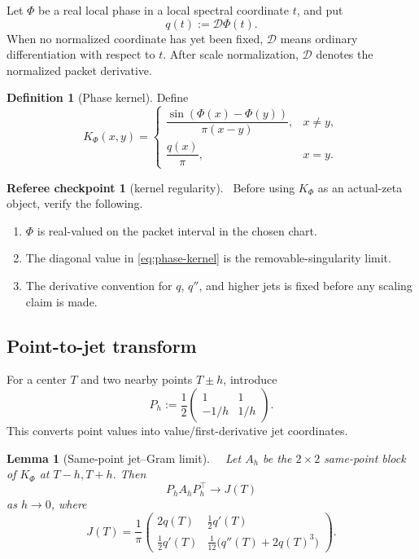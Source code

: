 \documentclass[11pt,a4paper]{amsart}
\newcommand{\Status}[1]{\textnormal{\fbox{\scriptsize\textsf{#1}}}}
\newcommand{\Core}{\Status{CORE}}
\newcommand{\Open}{\Status{OPEN}}
\newcommand{\Ph}{\Phi}
\newcommand{\D}{\mathcal D}
\theoremstyle{plain}
\newtheorem{lemma}[theorem]{Lemma}
\theoremstyle{definition}
\newtheorem{definition}[theorem]{Definition}
\newtheorem{checkpoint}[theorem]{Referee checkpoint}
\begin{document}
Let \(\Ph\) be a real local phase in a local spectral coordinate \(t\), and put
\[
        q(t):=\D\Ph(t).
\]
When no normalized coordinate has yet been fixed, \(\D\) means ordinary differentiation with respect to \(t\).  After scale normalization, \(\D\) denotes the normalized packet derivative.

\begin{definition}[Phase kernel]
\label{def:phase-kernel}
Define
\begin{equation}
\label{eq:phase-kernel}
K_\Ph(x,y)=
\begin{cases}
\dfrac{\sin(\Ph(x)-\Ph(y))}{\pi(x-y)}, & x\ne y,\\[1ex]
\dfrac{q(x)}{\pi}, & x=y.
\end{cases}
\end{equation}
\end{definition}

\begin{checkpoint}[kernel regularity]
\label{chk:kernel-regularity}
\Core\
Before using \(K_\Ph\) as an actual-zeta object, verify the following.
\begin{enumerate}[label=\textup{K\arabic*.},leftmargin=*]
\item \(\Ph\) is real-valued on the packet interval in the chosen chart.
\item The diagonal value in \eqref{eq:phase-kernel} is the removable-singularity limit.
\item The derivative convention for \(q\), \(q''\), and higher jets is fixed before any scaling claim is made.
\end{enumerate}
\end{checkpoint}

\subsection{Point-to-jet transform}
\label{subsec:point-to-jet-transform}

For a center \(T\) and two nearby points \(T\pm h\), introduce
\begin{equation}
\label{eq:point-to-jet-transform}
P_h:=\frac12
\begin{pmatrix}
1 & 1\\[1ex]
-1/h & 1/h
\end{pmatrix}.
\end{equation}
This converts point values into value/first-derivative jet coordinates.

\begin{lemma}[Same-point jet--Gram limit]
\label{lem:same-point-jetgram-limit}
\Core\ \Open\
Let \(A_h\) be the \(2\times2\) same-point block of \(K_\Ph\) at \(T-h,T+h\).  Then
\[
        P_hA_hP_h^\top \longrightarrow J(T)
\]
as \(h\to0\), where
\begin{equation}
\label{eq:same-point-J}
J(T)=\frac1\pi
\begin{pmatrix}
2q(T) & \frac12 q'(T)\\[1ex]
\frac12 q'(T) & \frac1{12}\bigl(q''(T)+2q(T)^3\bigr)
\end{pmatrix}.
\end{equation}
\end{lemma}
\end{document}
